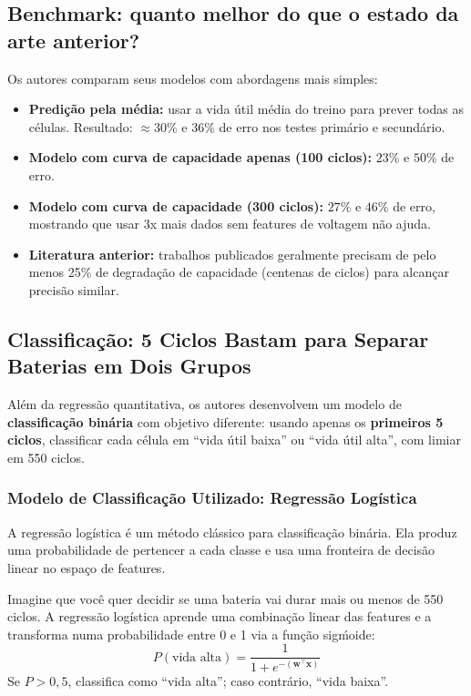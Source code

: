 \documentclass[12pt,a4paper]{article}
\begin{document}
\subsection{Benchmark: quanto melhor do que o estado da arte anterior?}

Os autores comparam seus modelos com abordagens mais simples:

\begin{itemize}
  \item \textbf{Predi\c{c}\~ao pela m\'{e}dia:} usar a vida \'{u}til m\'{e}dia do treino
    para prever todas as c\'{e}lulas. Resultado: $\approx 30\%$ e $36\%$ de erro
    nos testes prim\'{a}rio e secund\'{a}rio.
  \item \textbf{Modelo com curva de capacidade apenas (100 ciclos):}
    $23\%$ e $50\%$ de erro.
  \item \textbf{Modelo com curva de capacidade (300 ciclos):}
    $27\%$ e $46\%$ de erro, mostrando que usar 3x mais dados sem
    features de voltagem n\~ao ajuda.
  \item \textbf{Literatura anterior:} trabalhos publicados geralmente precisam
    de pelo menos 25\% de degrada\c{c}\~ao de capacidade (centenas de ciclos)
    para alcan\c{c}ar precis\~ao similar.
\end{itemize}

\subsection{Classifica\c{c}\~ao: 5 Ciclos Bastam para Separar Baterias em Dois Grupos}

Al\'{e}m da regress\~ao quantitativa, os autores desenvolvem um modelo de
\textbf{classifica\c{c}\~ao bin\'{a}ria} com objetivo diferente: usando apenas os
\textbf{primeiros 5 ciclos}, classificar cada c\'{e}lula em ``vida \'{u}til baixa''
ou ``vida \'{u}til alta'', com limiar em 550 ciclos.

\subsubsection{Modelo de Classifica\c{c}\~ao Utilizado: Regress\~ao Log\'{i}stica}

A regress\~ao log\'{i}stica \'{e} um m\'{e}todo cl\'{a}ssico para classifica\c{c}\~ao bin\'{a}ria.
Ela produz uma probabilidade de pertencer a cada classe e usa uma fronteira
de decis\~ao linear no espa\c{c}o de features.

\begin{conceito}
Imagine que voc\^{e} quer decidir se uma bateria vai durar mais ou menos de
550 ciclos. A regress\~ao log\'{i}stica aprende uma combina\c{c}\~ao linear das
features e a transforma numa probabilidade entre 0 e 1 via a fun\c{c}\~ao
sig\'moide:
\[P(\text{vida alta}) = \frac{1}{1 + e^{-(\mathbf{w}^\top \mathbf{x})}}\]
Se $P > 0{,}5$, classifica como ``vida alta''; caso contr\'{a}rio, ``vida baixa''.
\end{conceito}
\end{document}
